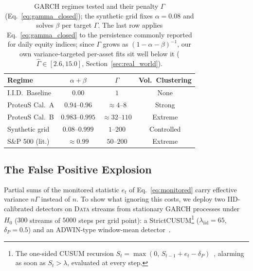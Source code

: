 \documentclass[sigconf,anonymous,review]{acmart}
\theoremstyle{acmdefinition}
\begin{document}
\begin{table}[t]
    \centering
    \caption{GARCH regimes tested and their penalty $\Gamma$ (Eq.~\eqref{eq:gamma_closed}); the synthetic grid fixes $\alpha = 0.08$ and solves $\beta$ per target $\Gamma$. The last row applies Eq.~\eqref{eq:gamma_closed} to the persistence commonly reported for daily equity indices; since $\Gamma$ grows as $(1-\alpha-\beta)^{-1}$, our own variance-targeted per-asset fits sit well below it ($\hat\Gamma \in [2.6, 15.0]$, Section~\ref{sec:real_world}).}
    \label{tab:stylized}
    \small
    \begin{tabular}{@{}lccc@{}}
        \toprule
        \textbf{Regime}  & \textbf{$\alpha + \beta$} & \textbf{$\Gamma$}   & \textbf{Vol.\ Clustering} \\
        \midrule
        I.I.D.\ Baseline & $0.00$                    & $1$                 & None                      \\
        ProteuS Cal.\ A  & $0.94$--$0.96$            & $\approx 4$--$8$    & Strong                    \\
        ProteuS Cal.\ B  & $0.983$--$0.995$          & $\approx 32$--$110$ & Extreme                   \\
        Synthetic grid   & $0.08$--$0.999$           & $1$--$200$          & Controlled                \\
        S\&P 500 (lit.)  & $\approx 0.99$            & $50$--$200$         & Extreme                   \\
        \bottomrule
    \end{tabular}
\end{table}

\subsection{The False Positive Explosion}\label{sec:fpr_explosion}

Partial sums of the monitored statistic $e_t$ of Eq.~\eqref{eq:monitored} carry effective variance $n\Gamma$ instead of $n$. To show what ignoring this costs, we deploy two IID-calibrated detectors on \textsc{Data} streams from stationary GARCH processes under $H_0$ ($300$ streams of $5000$ steps per grid point): a StrictCUSUM\footnote{The one-sided CUSUM recursion $S_t = \max(0,\, S_{t-1} + e_t - \delta_P)$~\cite{page_1954}, alarming as soon as $S_t > \lambda$, evaluated at every step.} ($\lambda_{\mathrm{iid}} = 65$, $\delta_P = 0.5$) and an ADWIN-type window-mean detector~\cite{bifet_adwin_2007}.
\end{document}
